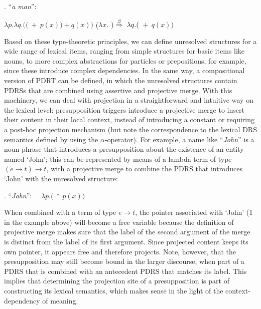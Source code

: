\ex. ``\textit{a man}'':~~\parbox[t]{\textwidth}{
     $\lambda p.\lambda q.(($$~+~p(x))+q(x))$ ($\lambda x.$
      $)\\
      \stackrel{\beta}{\Rightarrow}~\lambda q.($$~+~q(x))$}

Based on these type-theoretic principles, we can define unresolved
structures for a wide range of lexical items, ranging from simple structures
for basic items like nouns, to more complex abstractions for particles or
prepositions, for example, since these introduce complex dependencies.  In
the same way, a compositional version of PDRT can be defined, in which the
unresolved structures contain PDRSs that are combined using assertive and
projective merge. With this machinery, we can deal with projection in
a straightforward and intuitive way on the lexical level: presupposition
triggers introduce a projective merge to insert their content in their local
context, instead of introducing a constant
 or requiring
a post-hoc projection mechanism 
(but note the correspondence to the lexical DRS semantics defined by
 using the $\alpha$-operator).  For example,
a name like ``\emph{John}'' is a noun phrase that introduces
a presupposition about the existence of an entity named `John'; this can be
represented by means of a lambda-term of type $(e\rightarrow t)\rightarrow
t$, with a projective merge to combine the PDRS that introduces `John' with
the unresolved structure:

\ex. ``\textit{John}'':~~ 
  $\lambda p.($$~*~p(x))$

When combined with a term of type $e\rightarrow t$, the pointer associated
with `John' ($1$ in the example above) will become a free variable because
the definition of projective merge makes sure that the label of the second
argument of the merge is distinct from the label of its first argument.
Since projected content keeps its own pointer, it appears free and therefore
projects.  Note, however, that the presupposition may still become bound in
the larger discourse, when part of a PDRS that is combined with an
antecedent PDRS that matches its label. This implies that determining the
projection site of a presupposition is part of constructing its lexical
semantics, which makes sense in the light of the context-dependency of
meaning. 


